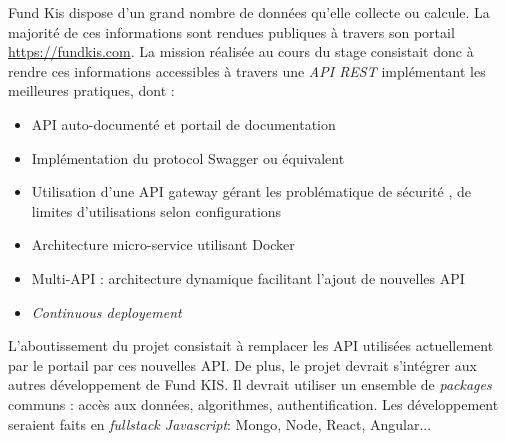 Fund Kis dispose d'un grand nombre de données qu'elle collecte ou calcule. La majorité de ces informations sont rendues publiques à travers son portail \url{https://fundkis.com}. La mission réalisée au cours du stage consistait donc à rendre ces informations accessibles à travers une \textit{API REST} implémentant les meilleures pratiques, dont :
\begin{itemize}
  \item API auto-documenté et portail de documentation
  \item Implémentation du protocol Swagger ou équivalent
  \item Utilisation d'une API gateway gérant les problématique de sécurité , de limites d'utilisations selon configurations
  \item Architecture micro-service utilisant Docker
  \item Multi-API : architecture dynamique facilitant l'ajout de nouvelles API
  \item \textit{Continuous deployement}
\end{itemize}

L'aboutissement du projet consistait à remplacer les API utilisées actuellement par le portail par ces nouvelles API. De plus, le projet devrait s'intégrer aux autres développement de Fund KIS. Il devrait utiliser un ensemble de \textit{packages} communs : accès aux données, algorithmes, authentification. Les développement seraient faits en \textit{fullstack Javascript}: Mongo, Node, React, Angular...



%
